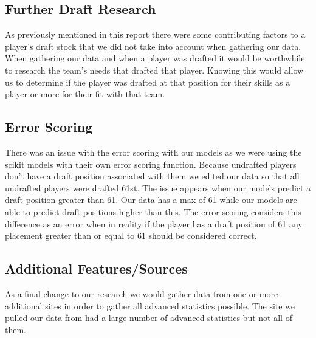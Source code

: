 \documentclass{article}
\begin{document}
\subsection{Further Draft Research}

As previously mentioned in this report there were some contributing factors to a
player’s draft stock that we did not take into account when gathering our data.
When gathering our data and when a player was drafted it would be worthwhile to
research the team’s needs that drafted that player. Knowing this would allow us
to determine if the player was drafted at that position for their skills as a
player or more for their fit with that team.

\subsection{Error Scoring}

There was an issue with the error scoring with our models as we were using the
scikit models with their own error scoring function. Because undrafted players
don’t have a draft position associated with them we edited our data so that all
undrafted players were drafted 61st. The issue appears when our models predict a
draft position greater than 61. Our data has a max of 61 while our models are
able to predict draft positions higher than this. The error scoring considers
this difference as an error when in reality if the player has a draft position
of 61 any placement greater than or equal to 61 should be considered correct. 

\subsection{Additional Features/Sources}

As a final change to our research we would gather data from one or more
additional sites in order to gather all advanced statistics possible. The site
we pulled our data from had a large number of advanced statistics but not all of
them.
\end{document}
